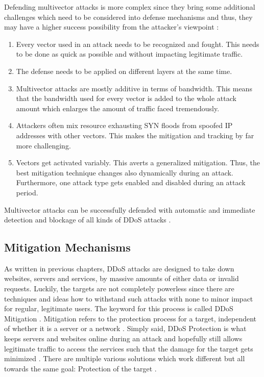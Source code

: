 Defending multivector attacks is more complex since they bring some additional challenges which need to be considered into defense mechanisms and thus, they may have a higher success possibility from the attacker's viewpoint \cite{Corero-MultivectorDDoS, Symantec-MultivectorDDoS}: 
\begin{enumerate}
    \item Every vector used in an attack needs to be recognized and fought. This needs to be done as quick as possible and without impacting legitimate traffic.
    \item The defense needs to be applied on different layers at the same time. 
    \item Multivector attacks are mostly additive in terms of bandwidth. This means that the bandwidth used for every vector is added to the whole attack amount which enlarges the amount of traffic faced tremendously. 
    \item Attackers often mix resource exhausting SYN floods from spoofed IP addresses with other vectors. This makes the mitigation and tracking by far more challenging.
    \item Vectors get activated variably. This averts a generalized mitigation. Thus, the best mitigation technique changes also dynamically during an attack. Furthermore, one attack type gets enabled and disabled during an attack period. 
\end{enumerate}

Multivector attacks can be successfully defended with automatic and immediate detection and blockage of all kinds of DDoS attacks \cite{Corero-MultivectorDDoS}. 


\subsection{Mitigation Mechanisms}

As written in previous chapters, DDoS attacks are designed to take down websites, servers and services, by massive amounts of either data or invalid requests. Luckily, the targets are not completely powerless since there are techniques and ideas how to withstand such attacks with none to minor impact for regular, legitimate users. The keyword for this process is called DDoS Mitigation \cite{Cloudflare-DDoSMitigation}. Mitigation refers to the protection process for a target, independent of whether it is a server or a network \cite{Cloudflare-DDoSMitigation}. Simply said, DDoS Protection is what keeps servers and websites online during an attack and hopefully still allows legitimate traffic to access the services such that the damage for the target gets minimized \cite{Cloudflare-DDoSMitigation}. There are multiple various solutions which work different but all towards the same goal: Protection of the target \cite{Wired-DDoSMitigation}.

